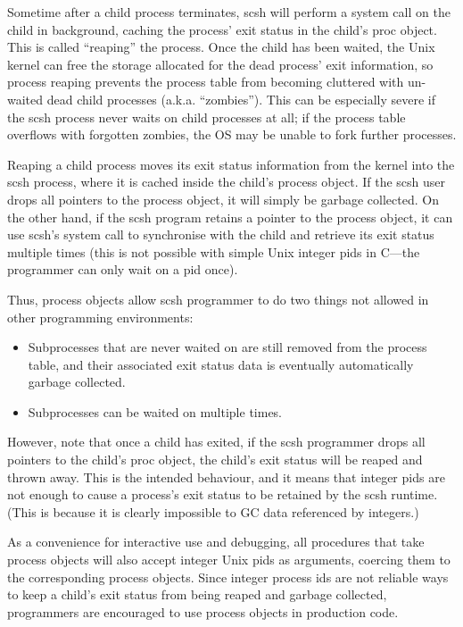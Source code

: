 Sometime after a child process terminates, scsh will perform a 
system call on the child in background, caching the process' exit status
in the child's proc object.
This is called ``reaping'' the process.
Once the child has been waited, the Unix kernel can free the storage allocated
for the dead process' exit information, so process reaping prevents the process
table from becoming cluttered with un-waited dead child processes 
(a.k.a. ``zombies'').
This can be especially severe if the scsh process never waits on child
processes at all; if the process table overflows with forgotten zombies,
the OS may be unable to fork further processes.

Reaping a child process moves its exit status information from the kernel
into the scsh process, where it is cached inside the child's process object.
If the scsh user drops all pointers to the process object, it will simply be
garbage collected.
On the other hand, if the scsh program retains a pointer to the process object,
it can use scsh's  system call to synchronise with the child and
retrieve its exit status multiple times (this is not possible with simple
Unix integer pids in C---the programmer can only wait on a pid once).

Thus, process objects allow scsh programmer to do two things not allowed
in other programming environments:
\begin{itemize}
\item Subprocesses that are never waited on are still removed from the
      process table, and their associated exit status data is eventually
      automatically garbage collected.
\item Subprocesses can be waited on multiple times.
\end{itemize}

However, note that once a child has exited, if the scsh programmer
drops all pointers to the child's proc object, the child's exit status
will be reaped and thrown away.
This is the intended behaviour, and it means that integer pids are not
enough to cause a process's exit status to be retained by the scsh runtime.
(This is because it is clearly impossible to GC data referenced by integers.)

As a convenience for interactive use and debugging, all procedures that
take process objects will also accept integer Unix pids as arguments,
coercing them to the corresponding process objects.
Since integer process ids are not reliable ways to keep a child's exit
status from being reaped and garbage collected, programmers are encouraged
to use process objects in production code.

